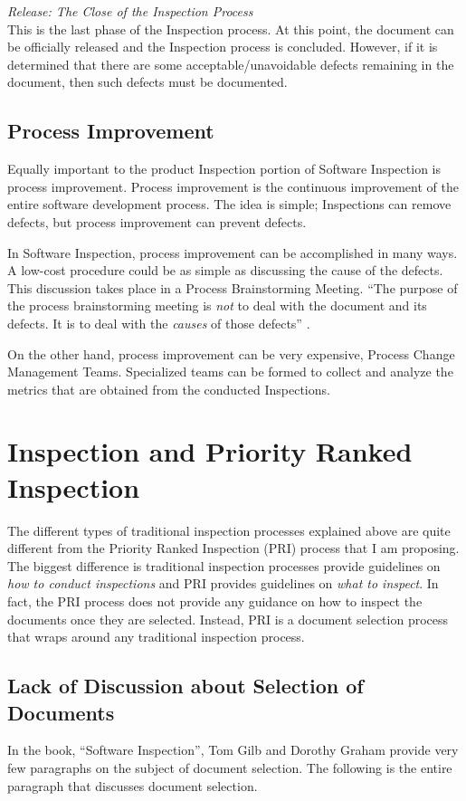 \begin{flushleft}
  \textit{Release: The Close of the Inspection Process} \\ This is the last 
  phase of the Inspection process. At this point, the document can be
  officially released and the Inspection process is concluded. However, if
  it is determined that there are some acceptable/unavoidable defects
  remaining in the document, then such defects must be documented.
\end{flushleft}


\subsection{Process Improvement}
Equally important to the product Inspection portion of Software Inspection
is process improvement. Process improvement is the continuous improvement
of the entire software development process. The idea is simple; Inspections
can remove defects, but process improvement can prevent defects.

In Software Inspection, process improvement can be accomplished in many
ways. A low-cost procedure could be as simple as discussing the cause of
the defects. This discussion takes place in a Process Brainstorming
Meeting. ``The purpose of the process brainstorming meeting is \textit{not}
to deal with the document and its defects. It is to deal with the
\textit{causes} of those defects'' \cite{Gilb93}.

On the other hand, process improvement can be very expensive, Process
Change Management Teams. Specialized teams can be formed to collect and
analyze the metrics that are obtained from the conducted Inspections.


\section{Inspection and Priority Ranked Inspection}
The different types of traditional inspection processes explained above are
quite different from the Priority Ranked Inspection (PRI) process that I am
proposing. The biggest difference is traditional inspection processes
provide guidelines on \textit{how to conduct inspections} and PRI provides
guidelines on \textit{what to inspect}. In fact, the PRI process does not
provide any guidance on how to inspect the documents once they are
selected. Instead, PRI is a document selection process that wraps around
any traditional inspection process.

\subsection{Lack of Discussion about Selection of Documents}
In the book, ``Software Inspection'', Tom Gilb and Dorothy Graham provide
very few paragraphs on the subject of document selection. The following is
the entire paragraph that discusses document selection.

